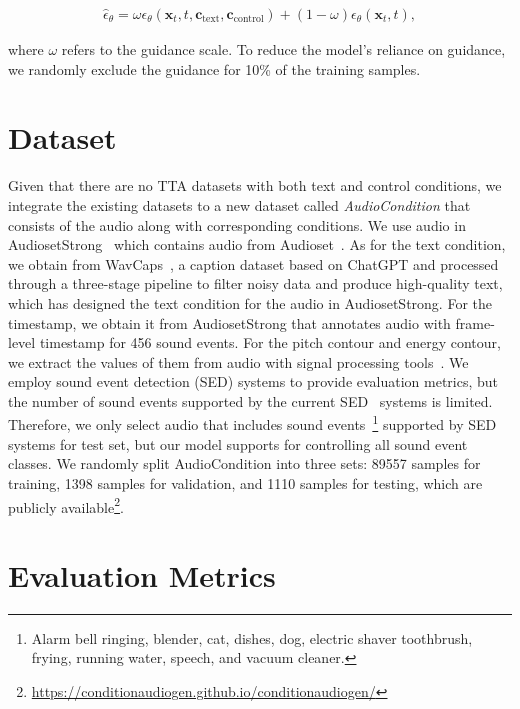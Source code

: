 \documentclass[letterpaper]{article}
\begin{document}
\begin{align}
\hat{\epsilon}_{\theta} = \omega\epsilon_{\theta}(\mathbf{x}_{t}, t, \mathbf{c}_{\text{text}}, \mathbf{c}_{\text{control}}) + (1 - \omega)\epsilon_{\theta}(\mathbf{x}_{t}, t),
\end{align}

where $\omega$ refers to the guidance scale. To reduce the model's reliance on guidance, we randomly exclude the guidance for 10\% of the training samples.

\section{Dataset}

Given that there are no TTA datasets with both text and control conditions, we integrate the existing datasets to a new dataset called \textit{AudioCondition} that consists of the audio along with corresponding conditions. We use audio in AudiosetStrong~\cite{hershey2021audiosetstrong} which contains audio from Audioset~\cite{gemmeke2017audioset}. As for the text condition, we obtain from WavCaps~\cite{mei2023wavecaps}, a caption dataset based on ChatGPT and processed through a three-stage pipeline to filter noisy data and produce high-quality text, which has designed the text condition for the audio in AudiosetStrong. For the timestamp, we obtain it from AudiosetStrong that annotates audio with frame-level timestamp for 456 sound events. For the pitch contour and energy contour, we extract the values of them from audio with signal processing tools~\cite{world2016morise,librosa2015masanori}. We employ sound event detection (SED) systems to provide evaluation metrics, but the number of sound events supported by the current SED~\cite{janek2021sased, janek2020fbsedt, janek2022pssed} systems is limited. Therefore, we only select audio that includes sound events~\footnote{Alarm bell ringing, blender, cat, dishes, dog, electric shaver toothbrush, frying, running water, speech, and vacuum cleaner.}
supported by SED systems for test set, but our model supports for controlling all sound event classes. We randomly split AudioCondition into three sets: 89557 samples for training, 1398 samples for validation, and 1110 samples for testing, which are publicly available\footnote{\url{https://conditionaudiogen.github.io/conditionaudiogen/}}.

\section{Evaluation Metrics}
\end{document}
